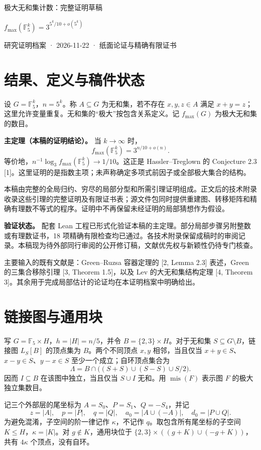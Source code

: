 \documentclass[11pt]{ctexart}
\begin{document}
极大无和集计数：完整证明草稿

\(f_{\max}(\mathbb{F}_5^k)=3^{5^k/10+o(5^k)}\)

研究证明档案 · 2026-11-22 · 纸面论证与精确有限证书

\section{结果、定义与稿件状态}

设 \(G=\mathbb{F}_5^k\)，\(n=5^k\)。称 \(A\subseteq G\) 为无和集，若不存在 \(x,y,z\in A\) 满足 \(x+y=z\)；这里允许变量重复。无和集的“极大”按包含关系定义。记 \(f_{\max}(G)\) 为极大无和集的数目。

\textbf{主定理（本稿的证明结论）。} 当 \(k\to\infty\) 时，
\[
 f_{\max}(\mathbb{F}_5^k)=3^{n/10+o(n)}.
\]
等价地，\(n^{-1}\log_3 f_{\max}(\mathbb{F}_5^k)\to 1/10\)。这正是 Hassler--Treglown 的 Conjecture 2.3 [1]。这里证明的是指数主项；未声称确定多项式前因子或全部极大集合的结构。

本稿由完整的全局归约、穷尽的局部分型和所需引理证明组成。正文后的技术附录收录这些引理的完整证明及有限证书表；源文件包同时提供重建图、转移矩阵和精确有理数不等式的程序。证明中不再保留未经证明的局部猜想作为假设。

\textbf{验证状态。} 配套 Lean 工程已形式化验证本稿的主定理。部分局部步骤另附整数或有理数证书，18 项精确有限检查均已通过。各技术附录保留成稿时的审阅记录。本稿现为待外部同行审阅的公开修订稿，文献优先权与新颖性仍待专门核查。

主要输入的既有文献是：Green--Ruzsa 容器定理的 [2, Lemma 2.3] 表述，Green 的三集合移除引理 [3, Theorem 1.5]，以及 Lev 的大无和集结构定理 [4, Theorem 3]。其余用于完成局部估计的论证均在本证明档案中明确给出。

\section{链接图与通用块}

写 \(G=\mathbb{F}_5\times H\)，\(h=|H|=n/5\)，并令 \(B=\{2,3\}\times H\)。对于无和集 \(S\subseteq G\setminus B\)，链接图 \(L_S[B]\) 的顶点集为 \(B\)。两个不同顶点 \(x,y\) 相邻，当且仅当 \(x+y\in S\)、\(x-y\in S\)、\(y-x\in S\) 至少一个成立；自环顶点集合为
\[
 \Lambda=B\cap\bigl((S+S)\cup(S-S)\cup S/2\bigr).
\]
因而 \(I\subseteq B\) 在该图中独立，当且仅当 \(S\cup I\) 无和。用 \(\operatorname{mis}(F)\) 表示图 \(F\) 的极大独立集数目。

记三个外部层的尾坐标为 \(A=S_0\)、\(P=S_1\)、\(Q=-S_4\)，并记
\[
 z=|A|,\quad p=|P|,\quad q=|Q|,\quad
 a_0=|A\cup(-A)|,\quad d_0=|P\cup Q|.
\]
为避免混淆，子空间的阶一律记作 \(\kappa\)，不记作 \(q\)。取包含所有尾坐标的子空间 \(K\le H\)，\(\kappa=|K|\)。对 \(g\notin K\)，通用块位于 \(\{2,3\}\times((g+K)\cup(-g+K))\)，共有 \(4\kappa\) 个顶点，没有自环。
\end{document}

